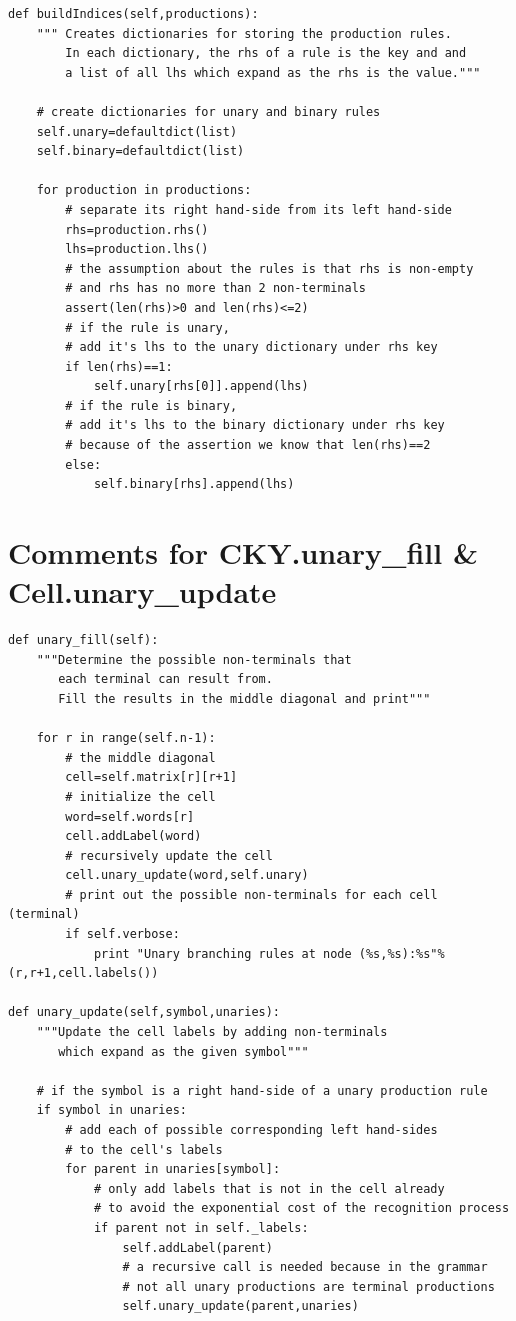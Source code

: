 \documentclass{article}
\begin{document}
\begin{lstlisting}
def buildIndices(self,productions):
	""" Creates dictionaries for storing the production rules.
	    In each dictionary, the rhs of a rule is the key and and
	    a list of all lhs which expand as the rhs is the value."""
	
	# create dictionaries for unary and binary rules
	self.unary=defaultdict(list)
	self.binary=defaultdict(list)
	
	for production in productions:
		# separate its right hand-side from its left hand-side
		rhs=production.rhs()
		lhs=production.lhs()
		# the assumption about the rules is that rhs is non-empty
		# and rhs has no more than 2 non-terminals
		assert(len(rhs)>0 and len(rhs)<=2)
		# if the rule is unary, 
		# add it's lhs to the unary dictionary under rhs key
		if len(rhs)==1:
			self.unary[rhs[0]].append(lhs)
		# if the rule is binary, 
		# add it's lhs to the binary dictionary under rhs key
		# because of the assertion we know that len(rhs)==2
		else:
			self.binary[rhs].append(lhs)
\end{lstlisting}

\hfill \break


\section{Comments for CKY.unary\_fill \& Cell.unary\_update}
\begin{lstlisting}
def unary_fill(self):
	"""Determine the possible non-terminals that 
	   each terminal can result from. 
	   Fill the results in the middle diagonal and print"""
	
	for r in range(self.n-1):
		# the middle diagonal
		cell=self.matrix[r][r+1]
		# initialize the cell
		word=self.words[r]
		cell.addLabel(word)
		# recursively update the cell
		cell.unary_update(word,self.unary)
		# print out the possible non-terminals for each cell (terminal)
		if self.verbose:
			print "Unary branching rules at node (%s,%s):%s"%(r,r+1,cell.labels())
			
def unary_update(self,symbol,unaries):
	"""Update the cell labels by adding non-terminals 
	   which expand as the given symbol"""
	   
	# if the symbol is a right hand-side of a unary production rule
	if symbol in unaries:
		# add each of possible corresponding left hand-sides
		# to the cell's labels
		for parent in unaries[symbol]:
			# only add labels that is not in the cell already
			# to avoid the exponential cost of the recognition process
			if parent not in self._labels:
				self.addLabel(parent)
				# a recursive call is needed because in the grammar 
				# not all unary productions are terminal productions
				self.unary_update(parent,unaries)
\end{lstlisting}
\end{document}
